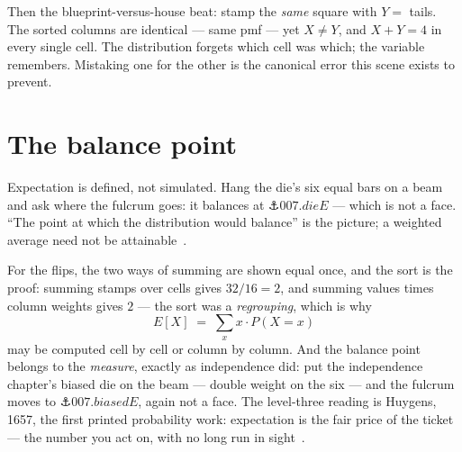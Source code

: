 \begin{narrative}
Then the blueprint-versus-house beat: stamp the \emph{same} square
with $Y =$ tails. The sorted columns are identical — same pmf — yet
$X \neq Y$, and $X + Y = 4$ in every single cell. The distribution
forgets which cell was which; the variable remembers. Mistaking one
for the other is the canonical error this scene exists to prevent.

\section{The balance point}

Expectation is defined, not simulated. Hang the die's six equal bars
on a beam and ask where the fulcrum goes: it balances at
$\anchor{007.dieE}$ — which is not a face. ``The point at which the
distribution would balance'' is the picture; a weighted average need
not be attainable~\cite{probability-orloff-bloom-mit-18-05-class-4b-expectation}.

\begin{center}
\end{center}

For the flips, the two ways of summing are shown equal once, and the
sort is the proof: summing stamps over cells gives $32/16 = 2$, and
summing values times column weights gives $2$ — the sort was a
\emph{regrouping}, which is why
\[
  E[X] \;=\; \sum_x x \cdot P(X = x)
\]
may be computed cell by cell or column by column. And the balance
point belongs to the \emph{measure}, exactly as independence did: put
the independence chapter's biased die on the beam — double weight on
the six — and
the fulcrum moves to $\anchor{007.biasedE}$, again not a face. The
level-three reading is Huygens, 1657, the first printed probability
work: expectation is the fair price of the ticket — the number you
act on, with no long run in
sight~\cite{probability-j-j-o-connor-and-e-f-robertson-christiaan-huygens-mactutor}.


\end{narrative}
